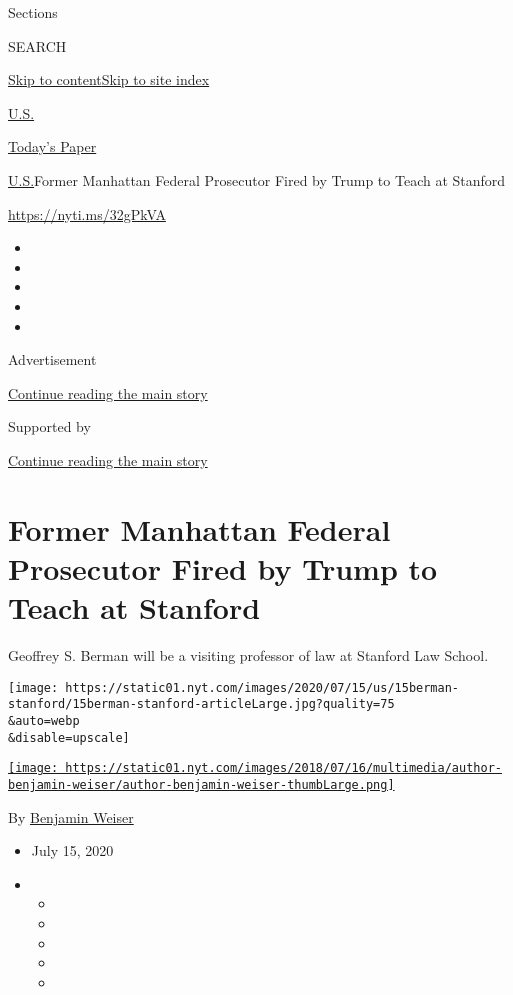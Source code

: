 Sections

SEARCH

\protect\hyperlink{site-content}{Skip to
content}\protect\hyperlink{site-index}{Skip to site index}

\href{https://www.nytimes.com/section/us}{U.S.}

\href{https://myaccount.nytimes.com/auth/login?response_type=cookie\&client_id=vi}{}

\href{https://www.nytimes.com/section/todayspaper}{Today's Paper}

\href{/section/us}{U.S.}\textbar{}Former Manhattan Federal Prosecutor
Fired by Trump to Teach at Stanford

\url{https://nyti.ms/32gPkVA}

\begin{itemize}
\item
\item
\item
\item
\item
\end{itemize}

Advertisement

\protect\hyperlink{after-top}{Continue reading the main story}

Supported by

\protect\hyperlink{after-sponsor}{Continue reading the main story}

\hypertarget{former-manhattan-federal-prosecutor-fired-by-trump-to-teach-at-stanford}{%
\section{Former Manhattan Federal Prosecutor Fired by Trump to Teach at
Stanford}\label{former-manhattan-federal-prosecutor-fired-by-trump-to-teach-at-stanford}}

Geoffrey S. Berman will be a visiting professor of law at Stanford Law
School.

\texttt{[image: https://static01.nyt.com/images/2020/07/15/us/15berman-stanford/15berman-stanford-articleLarge.jpg?quality=75\\\&auto=webp\\\&disable=upscale]}

\href{https://www.nytimes.com/by/benjamin-weiser}{\texttt{[image: https://static01.nyt.com/images/2018/07/16/multimedia/author-benjamin-weiser/author-benjamin-weiser-thumbLarge.png]}}

By \href{https://www.nytimes.com/by/benjamin-weiser}{Benjamin Weiser}

\begin{itemize}
\item
  July 15, 2020
\item
  \begin{itemize}
  \item
  \item
  \item
  \item
  \item
  \end{itemize}
\end{itemize}


